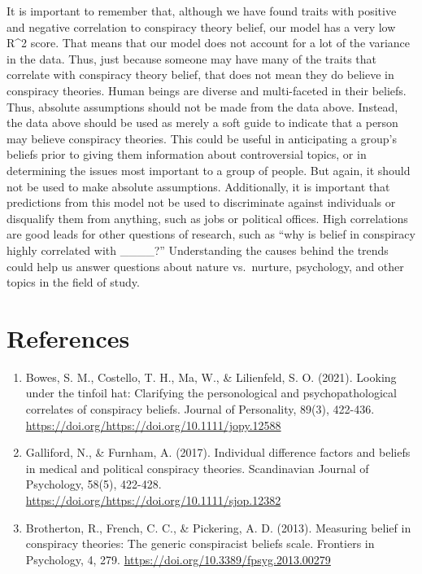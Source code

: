 \documentclass{article}[11pt]
\begin{document}
It is important to remember that, although we have found traits with
positive and negative correlation to conspiracy theory belief, our model
has a very low R\^{}2 score. That means that our model does not account
for a lot of the variance in the data. Thus, just because someone may
have many of the traits that correlate with conspiracy theory belief,
that does not mean they do believe in conspiracy theories. Human beings
are diverse and multi-faceted in their beliefs. Thus, absolute
assumptions should not be made from the data above. Instead, the data
above should be used as merely a soft guide to indicate that a person
may believe conspiracy theories. This could be useful in anticipating a
group's beliefs prior to giving them information about controversial
topics, or in determining the issues most important to a group of
people. But again, it should not be used to make absolute assumptions.
Additionally, it is important that predictions from this model not be
used to discriminate against individuals or disqualify them from
anything, such as jobs or political offices. High correlations are good
leads for other questions of research, such as ``why is belief in
conspiracy highly correlated with \_\_\_\_?'' Understanding the causes
behind the trends could help us answer questions about nature
vs.~nurture, psychology, and other topics in the field of study.

\newpage
\hypertarget{references}{%
\section*{References}\label{references}}
\begin{enumerate}
\item Bowes, S. M., Costello, T. H., Ma, W., \& Lilienfeld, S. O. (2021).
Looking under the tinfoil hat: Clarifying the personological and
psychopathological correlates of conspiracy beliefs. Journal of
Personality, 89(3), 422-436.
\newline\url{https://doi.org/https://doi.org/10.1111/jopy.12588}

\item Galliford, N., \& Furnham, A. (2017). Individual difference factors and beliefs in medical
and political conspiracy theories. Scandinavian Journal of Psychology,
58(5), 422-428. \newline\url{https://doi.org/https://doi.org/10.1111/sjop.12382}

\item Brotherton, R., French, C. C., \& Pickering, A. D. (2013). Measuring belief in conspiracy theories: The generic conspiracist beliefs scale. Frontiers in Psychology, 4, 279. \newline\url{https://doi.org/10.3389/fpsyg.2013.00279}

\end{enumerate}


    
    
    
\end{document}
